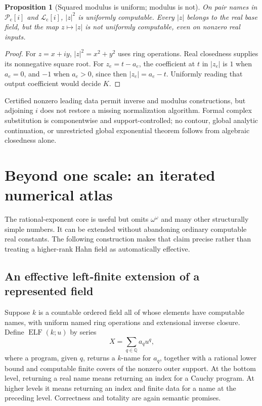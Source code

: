 \documentclass[11pt,letterpaper]{article}
\numberwithin{equation}{section}
\newtheorem{proposition}[theorem]{Proposition}
\theoremstyle{definition}
\theoremstyle{remark}
\newcommand{\Lc}{\mathcal L_{\mathrm c}}
\newcommand{\Pc}{\mathcal P_{\mathrm c}}
\newcommand{\Q}{\mathbb Q}
\begin{document}
\begin{proposition}[Squared modulus is uniform; modulus is not]
\label{prop:modulus}
On pair names in $\Pc[i]$ and $\Lc[i]$, $|z|^2$ is uniformly computable.
Every $|z|$ belongs to the real base field, but the map $z\mapsto|z|$ is not
uniformly computable, even on nonzero real inputs.
\end{proposition}
\begin{proof}
For $z=x+iy$, $|z|^2=x^2+y^2$ uses ring operations. Real closedness supplies
its nonnegative square root. For $z_e=t-a_e$, the coefficient at $t$ in
$|z_e|$ is $1$ when $a_e=0$, and $-1$ when $a_e>0$, since then
$|z_e|=a_e-t$. Uniformly reading that output coefficient would decide $K$.
\end{proof}
Certified nonzero leading data permit inverse and modulus constructions, but
adjoining $i$ does not restore a missing normalization algorithm. Formal
complex substitution is componentwise and support-controlled; no contour,
global analytic continuation, or unrestricted global exponential theorem
follows from algebraic closedness alone.

\section{Beyond one scale: an iterated numerical atlas}
\label{sec:higher}

The rational-exponent core is useful but omits $\omega^\omega$ and many
other structurally simple numbers. It can be extended without abandoning
ordinary computable real constants. The following construction makes that
claim precise rather than treating a higher-rank Hahn field as automatically
effective.

\subsection{An effective left-finite extension of a represented field}

Suppose $k$ is a countable ordered field all of whose elements have
computable names, with uniform named ring operations and extensional
inverse closure. Define
$\operatorname{ELF}(k;u)$ by series
\[
 X=\sum_{q\in\Q} a_q u^q,
\]
where a program, given $q$, returns a $k$-name for $a_q$, together with a
rational lower bound and computable finite covers of the nonzero outer
support. At the bottom level, returning a real name means returning an
index for a Cauchy program. At higher levels it means returning an index
and finite data for a name at the preceding level. Correctness and totality
are again semantic promises.
\end{document}
